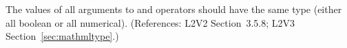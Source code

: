 The values of all arguments to  and  operators should
have the same type (either all boolean or all numerical).
(References: L2V2 Section~3.5.8; L2V3
Section~\ref{sec:mathmltype}.)
